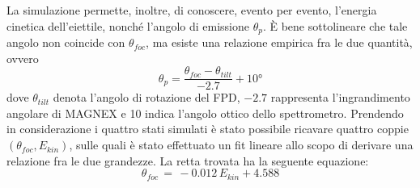 La simulazione permette, inoltre, di conoscere, evento per evento, l'energia cinetica dell'eiettile, nonché l'angolo di emissione $\theta_{p}$.
È bene sottolineare che tale angolo non coincide con $\theta_{foc}$, ma esiste una relazione empirica fra le due quantità, ovvero
\begin{equation}
	\theta_{p} = \frac{\theta_{foc} - \theta_{tilt}}{-2.7} + \ang{10}
\end{equation}
dove $\theta_{tilt}$ denota l'angolo di rotazione del FPD, $-2.7$ rappresenta l'ingrandimento angolare di MAGNEX e 10\textdegree{} indica l'angolo ottico dello spettrometro.
Prendendo in considerazione i quattro stati simulati è stato possibile ricavare quattro coppie $(\theta_{foc} , E_{kin})$, sulle quali è stato effettuato un fit lineare allo scopo di derivare una relazione fra le due grandezze.
La retta trovata ha la seguente equazione:
\begin{equation} \label{eq:correlazione_angolo_energia}
	\theta_{foc} \, = \, -0.012 \, E_{kin} + 4.588
\end{equation}

